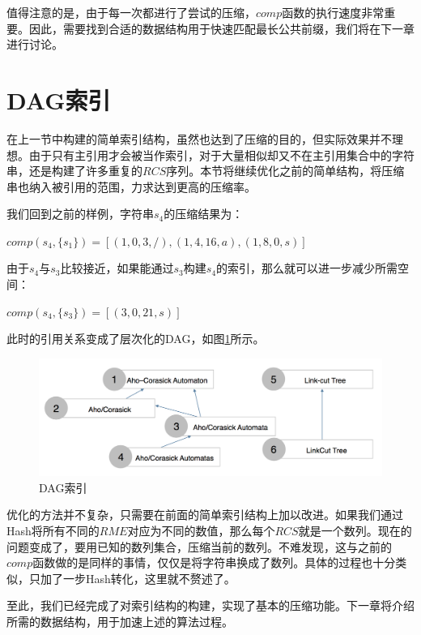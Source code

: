 ﻿\documentclass{sysuthesis}
\begin{document}
值得注意的是，由于每一次都进行了尝试的压缩，$comp$函数的执行速度非常重要。因此，需要找到合适的数据结构用于快速匹配最长公共前缀，我们将在下一章进行讨论。



\section{DAG索引}
在上一节中构建的简单索引结构，虽然也达到了压缩的目的，但实际效果并不理想。由于只有主引用才会被当作索引，对于大量相似却又不在主引用集合中的字符串，还是构建了许多重复的$RCS$序列。本节将继续优化之前的简单结构，将压缩串也纳入被引用的范围，力求达到更高的压缩率。\par
我们回到之前的样例，字符串$s_{4}$的压缩结果为：\par
\hspace{1cm}$comp(s_{4}, \{s_{1}\}) = [(1, 0, 3, /), (1, 4, 16, a), (1, 8, 0, s)]$\par
由于$s_{4}$与$s_{3}$比较接近，如果能通过$s_{3}$构建$s_{4}$的索引，那么就可以进一步减少所需空间：\par
\hspace{1cm}$comp(s_{4}, \{s_{3}\}) = [(3, 0, 21, s)]$\par
此时的引用关系变成了层次化的DAG，如图\ref{image:cdag}所示。\par

\begin{figure}[htbp]
	\centering
	\includegraphics[scale=0.3]{image/cdag.png}
	\caption{DAG索引}\label{image:cdag}
\end{figure}

优化的方法并不复杂，只需要在前面的简单索引结构上加以改进。如果我们通过Hash将所有不同的$RME$对应为不同的数值，那么每个$RCS$就是一个数列。现在的问题变成了，要用已知的数列集合，压缩当前的数列。不难发现，这与之前的$comp$函数做的是同样的事情，仅仅是将字符串换成了数列。具体的过程也十分类似，只加了一步Hash转化，这里就不赘述了。\par
至此，我们已经完成了对索引结构的构建，实现了基本的压缩功能。下一章将介绍所需的数据结构，用于加速上述的算法过程。
\end{document}

